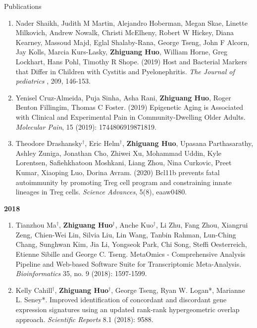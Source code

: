 \documentclass{resume} %
\begin{document}
\begin{rSection}{Publications}
\begin{enumerate}[noitemsep,topsep=0pt,resume]
\item  
Nader Shaikh, Judith M Martin, Alejandro Hoberman, Megan Skae, Linette Milkovich, Andrew Nowalk, Christi McElheny, Robert W Hickey, Diana Kearney, Massoud Majd, Eglal Shalaby-Rana, George Tseng, John F Alcorn, Jay Kolls, Marcia Kurs-Lasky, {\bf Zhiguang Huo}, William Horne, Greg Lockhart, Hans Pohl, Timothy R Shope. 
(2019)
Host and Bacterial Markers that Differ in Children with Cystitis and Pyelonephritis. \emph{The Journal of pediatrics} , 209, 146-153.

\item Yenisel Cruz-Almeida, Puja Sinha, Asha Rani, {\bf Zhiguang Huo}, Roger Benton Fillingim, Thomas C Foster. (2019)
Epigenetic Aging is Associated with Clinical and Experimental Pain in Community-Dwelling Older Adults.
\emph{Molecular Pain}, 15 (2019): 1744806919871819.

\item 
Theodore Drashansky$^\dagger$, Eric  Helm$^\dagger$, {\bf Zhiguang Huo}, Upasana Parthasarathy,  Ashley Zuniga, Jonathan Cho, Zhiwei Xu,  Mohammad Uddin,  Kyle Lorentsen, Safiehkhatoon Moshkani, Liang Zhou, Nina Curkovic, Preet Kumar,  Xiaoping Luo, Dorina Avram. (2020)
Bcl11b prevents fatal autoimmunity by promoting Treg cell program and constraining innate lineages in Treg cells. 
\emph{Science Advances}, 5(8), eaaw0480.




\end{enumerate}


\textbf{2018}
\begin{enumerate}[noitemsep,topsep=0pt, resume]

\item Tianzhou Ma$^\dagger$, {\bf  Zhiguang Huo$^\dagger$}, Anche Kuo$^\dagger$, Li Zhu, Fang Zhou, Xiangrui Zeng, Chien-Wei Lin, Silvia Liu, Lin Wang, Tanbin Rahman, Lun-Ching Chang, Sunghwan Kim, Jia Li, Yongseok Park, Chi Song, Steffi Oesterreich, Etienne Sibille and George C. Tseng. 
MetaOmics - Comprehensive Analysis Pipeline and Web-based Software Suite for Transcriptomic Meta-Analysis. \emph{Bioinformatics} 35, no. 9 (2018): 1597-1599. 


\item Kelly Cahill$^\dagger$, {\bf  Zhiguang Huo$^\dagger$}, George Tseng, Ryan W. Logan*, Marianne L. Seney*.
Improved identification of concordant and discordant gene expression signatures using an updated rank-rank hypergeometric overlap approach. \emph{Scientific Reports} 8.1 (2018): 9588.


\end{enumerate}
\end{rSection}
\end{document}
